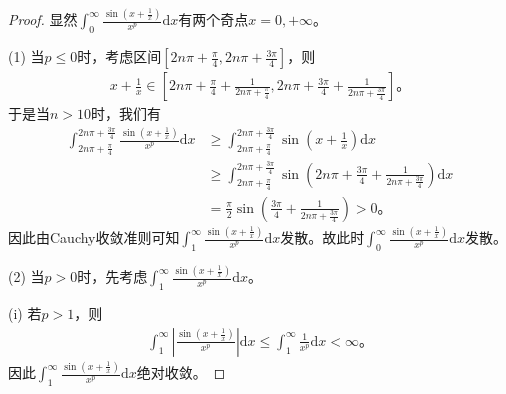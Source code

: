 \documentclass[../../main.tex]{subfiles}
\begin{document}
\begin{proof}
显然\(\int_0^{\infty}{\frac{\sin \left( x+\frac{1}{x} \right)}{x^p}\mathrm{d}x}\)有两个奇点\(x=0,+\infty\)。

(1) 当\(p\leqslant 0\)时，考虑区间\(\left[ 2n\pi +\frac{\pi}{4},2n\pi +\frac{3\pi}{4} \right]\)，则
\begin{align*}
x+\frac{1}{x}\in \left[ 2n\pi +\frac{\pi}{4}+\frac{1}{2n\pi +\frac{\pi}{4}},2n\pi +\frac{3\pi}{4}+\frac{1}{2n\pi +\frac{3\pi}{4}} \right]。
\end{align*}
于是当\(n>10\)时，我们有
\begin{align*}
\int_{2n\pi +\frac{\pi}{4}}^{2n\pi +\frac{3\pi}{4}}{\frac{\sin \left( x+\frac{1}{x} \right)}{x^p}\mathrm{d}x}&\geqslant \int_{2n\pi +\frac{\pi}{4}}^{2n\pi +\frac{3\pi}{4}}{\sin \left( x+\frac{1}{x} \right) \mathrm{d}x}\\
&\geqslant \int_{2n\pi +\frac{\pi}{4}}^{2n\pi +\frac{3\pi}{4}}{\sin \left( 2n\pi +\frac{3\pi}{4}+\frac{1}{2n\pi +\frac{3\pi}{4}} \right) \mathrm{d}x}\\
&=\frac{\pi}{2}\sin \left( \frac{3\pi}{4}+\frac{1}{2n\pi +\frac{3\pi}{4}} \right) >0。
\end{align*}
因此由Cauchy收敛准则可知\(\int_1^{\infty}{\frac{\sin \left( x+\frac{1}{x} \right)}{x^p}\mathrm{d}x}\)发散。故此时\(\int_0^{\infty}{\frac{\sin \left( x+\frac{1}{x} \right)}{x^p}\mathrm{d}x}\)发散。

(2) 当\(p>0\)时，先考虑\(\int_1^{\infty}{\frac{\sin \left( x+\frac{1}{x} \right)}{x^p}\mathrm{d}x}\)。

(i) 若\(p>1\)，则
\begin{align*}
\int_1^{\infty}{\left| \frac{\sin \left( x+\frac{1}{x} \right)}{x^p} \right|\mathrm{d}x}\leqslant \int_1^{\infty}{\frac{1}{x^p}\mathrm{d}x}<\infty。
\end{align*}
因此\(\int_1^{\infty}{\frac{\sin \left( x+\frac{1}{x} \right)}{x^p}\mathrm{d}x}\)绝对收敛。


\end{proof}
\end{document}

